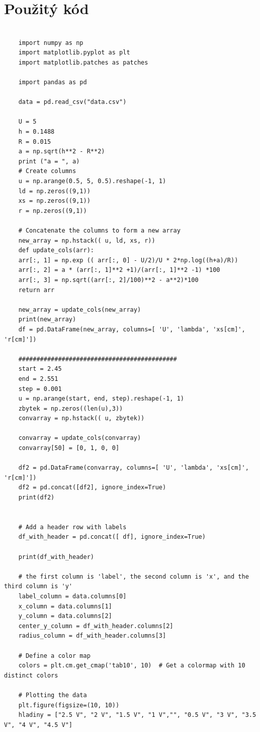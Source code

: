 \documentclass[czech,11pt,a4paper]{article}
\begin{document}
	\section{Použitý kód}
	{\tiny \begin{verbatim}
	
	import numpy as np
	import matplotlib.pyplot as plt
	import matplotlib.patches as patches
	
	import pandas as pd
	
	data = pd.read_csv("data.csv")
	
	U = 5
	h = 0.1488
	R = 0.015
	a = np.sqrt(h**2 - R**2)
	print ("a = ", a)
	# Create columns
	u = np.arange(0.5, 5, 0.5).reshape(-1, 1)
	ld = np.zeros((9,1)) 
	xs = np.zeros((9,1))  
	r = np.zeros((9,1))  
	
	# Concatenate the columns to form a new array
	new_array = np.hstack(( u, ld, xs, r))
	def update_cols(arr):
	arr[:, 1] = np.exp (( arr[:, 0] - U/2)/U * 2*np.log((h+a)/R))
	arr[:, 2] = a * (arr[:, 1]**2 +1)/(arr[:, 1]**2 -1) *100
	arr[:, 3] = np.sqrt((arr[:, 2]/100)**2 - a**2)*100
	return arr
	
	new_array = update_cols(new_array)
	print(new_array)
	df = pd.DataFrame(new_array, columns=[ 'U', 'lambda', 'xs[cm]', 'r[cm]'])
	
	############################################
	start = 2.45
	end = 2.551
	step = 0.001
	u = np.arange(start, end, step).reshape(-1, 1)
	zbytek = np.zeros((len(u),3)) 
	convarray = np.hstack(( u, zbytek))
	
	convarray = update_cols(convarray)
	convarray[50] = [0, 1, 0, 0]
	
	df2 = pd.DataFrame(convarray, columns=[ 'U', 'lambda', 'xs[cm]', 'r[cm]'])
	df2 = pd.concat([df2], ignore_index=True)
	print(df2)
	
	
	# Add a header row with labels
	df_with_header = pd.concat([ df], ignore_index=True)
	
	print(df_with_header)
	
	# the first column is 'label', the second column is 'x', and the third column is 'y'
	label_column = data.columns[0]
	x_column = data.columns[1]
	y_column = data.columns[2]
	center_y_column = df_with_header.columns[2]
	radius_column = df_with_header.columns[3]
	
	# Define a color map
	colors = plt.cm.get_cmap('tab10', 10)  # Get a colormap with 10 distinct colors
	
	# Plotting the data
	plt.figure(figsize=(10, 10))
	hladiny = ["2.5 V", "2 V", "1.5 V", "1 V","", "0.5 V", "3 V", "3.5 V", "4 V", "4.5 V"]
	

\end{verbatim}}
\end{document}
